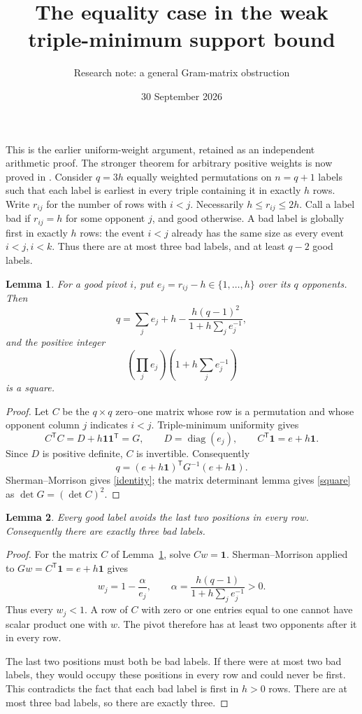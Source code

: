 \documentclass[11pt]{article}
\title{The equality case in the weak triple-minimum support bound}
\author{Research note: a general Gram-matrix obstruction}
\date{30 September 2026}
\newtheorem{lemma}{Lemma}
\begin{document}
\maketitle
This is the earlier uniform-weight argument, retained as an independent
arithmetic proof. The stronger theorem for arbitrary positive weights
is now proved in .
Consider $q=3h$ equally weighted permutations on $n=q+1$ labels such
that each label is earliest in every triple containing it in exactly
$h$ rows. Write $r_{ij}$ for the number of rows with $i<j$.
Necessarily $h\le r_{ij}\le2h$.
Call a label bad if $r_{ij}=h$ for some opponent $j$, and good otherwise.
A bad label is globally first in exactly $h$ rows: the event $i<j$
already has the same size as every event $i<j,i<k$. Thus there are at
most three bad labels, and at least $q-2$ good labels.

\begin{lemma}\label{gram}
For a good pivot $i$, put $e_j=r_{ij}-h\in\{1,\ldots,h\}$ over its
$q$ opponents. Then
\begin{equation}\label{identity}
 q=\sum_j e_j+h-
       \frac{h(q-1)^2}{1+h\sum_j e_j^{-1}},
\end{equation}
and the positive integer
\begin{equation}\label{square}
 \left(\prod_j e_j\right)\left(1+h\sum_j e_j^{-1}\right)
\end{equation}
is a square.
\end{lemma}
\begin{proof}
Let $C$ be the $q\times q$ zero--one matrix whose row is a permutation
and whose opponent column $j$ indicates $i<j$. Triple-minimum
uniformity gives
\[
 C^{\mathsf T}C=D+h\mathbf1\mathbf1^{\mathsf T}=G,
 \qquad D=\operatorname{diag}(e_j),
 \qquad C^{\mathsf T}\mathbf1=e+h\mathbf1.
\]
Since $D$ is positive definite, $C$ is invertible. Consequently
\[
 q=(e+h\mathbf1)^{\mathsf T}G^{-1}(e+h\mathbf1).
\]
Sherman--Morrison gives \eqref{identity}; the matrix determinant lemma
gives \eqref{square} as $\det G=(\det C)^2$.
\end{proof}

\begin{lemma}\label{lasttwo}
Every good label avoids the last two positions in every row.
Consequently there are exactly three bad labels.
\end{lemma}
\begin{proof}
For the matrix $C$ of Lemma~\ref{gram}, solve $Cw=\mathbf1$.
Sherman--Morrison applied to
$Gw=C^{\mathsf T}\mathbf1=e+h\mathbf1$ gives
\[
 w_j=1-\frac{\alpha}{e_j},\qquad
 \alpha=\frac{h(q-1)}{1+h\sum_j e_j^{-1}}>0.
\]
Thus every $w_j<1$. A row of $C$ with zero or one entries equal to
one cannot have scalar product one with $w$. The pivot therefore
has at least two opponents after it in every row.

The last two positions must both be bad labels. If there were at
most two bad labels, they would occupy these positions in every
row and could never be first. This contradicts the fact that each
bad label is first in $h>0$ rows. There are at most three bad labels,
so there are exactly three.
\end{proof}
\end{document}
